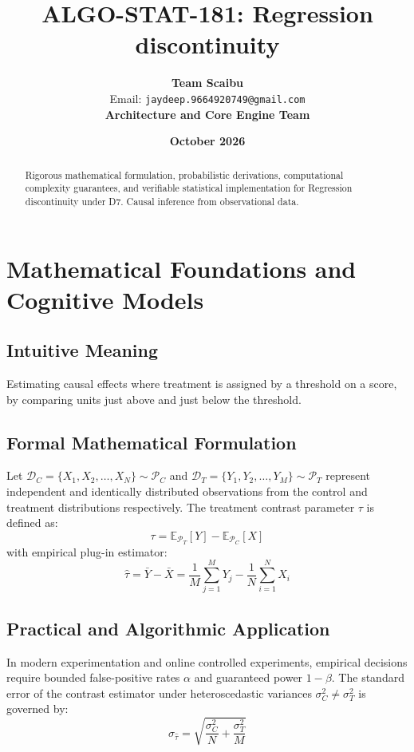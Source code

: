 \documentclass[11pt,a4paper]{article}
\title{\textbf{ALGO-STAT-181: Regression discontinuity}}
\author{\textbf{Team Scaibu} \\ \small Email: \texttt{jaydeep.9664920749@gmail.com} \\ \small \textbf{Architecture and Core Engine Team}}
\date{\textbf{October 2026}}
\theoremstyle{definition}
\begin{document}
\maketitle

\begin{abstract}
Rigorous mathematical formulation, probabilistic derivations, computational complexity guarantees, and verifiable statistical implementation for Regression discontinuity under D7. Causal inference from observational data.
\end{abstract}

\section{Mathematical Foundations and Cognitive Models}

\subsection{Intuitive Meaning}
Estimating causal effects where treatment is assigned by a threshold on a score, by comparing units just above and just below the threshold.

\subsection{Formal Mathematical Formulation}
Let $\mathcal{D}_C = \{X_1, X_2, \dots, X_N\} \sim \mathcal{P}_C$ and $\mathcal{D}_T = \{Y_1, Y_2, \dots, Y_M\} \sim \mathcal{P}_T$ represent independent and identically distributed observations from the control and treatment distributions respectively.
The treatment contrast parameter $\tau$ is defined as:
\begin{equation}
\tau = \mathbb{E}_{\mathcal{P}_T}[Y] - \mathbb{E}_{\mathcal{P}_C}[X]
\end{equation}
with empirical plug-in estimator:
\begin{equation}
\hat{\tau} = \bar{Y} - \bar{X} = \frac{1}{M} \sum_{j=1}^M Y_j - \frac{1}{N} \sum_{i=1}^N X_i
\end{equation}

\subsection{Practical and Algorithmic Application}
In modern experimentation and online controlled experiments, empirical decisions require bounded false-positive rates $\alpha$ and guaranteed power $1 - \beta$.
The standard error of the contrast estimator under heteroscedastic variances $\sigma_C^2 \neq \sigma_T^2$ is governed by:
\begin{equation}
\sigma_{\hat{\tau}} = \sqrt{\frac{\sigma_C^2}{N} + \frac{\sigma_T^2}{M}}
\end{equation}
\end{document}
